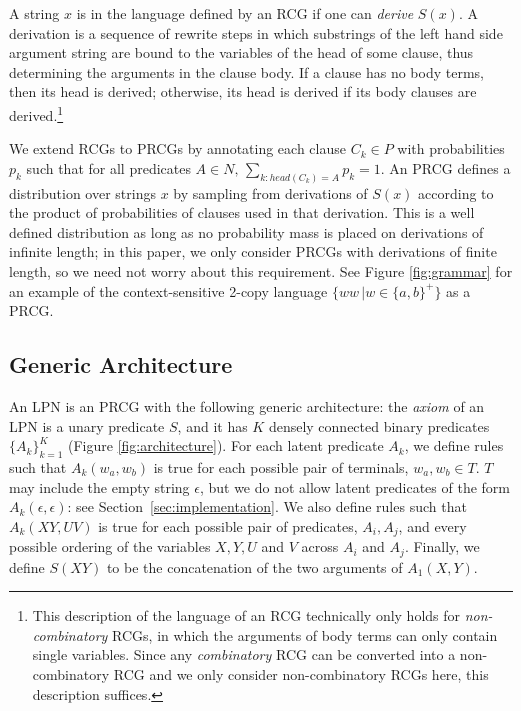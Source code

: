 \documentclass[10pt, twocolumn]{article}
\begin{document}
A string $x$ is in the language defined by an RCG if one can
\emph{derive} $S(x)$. A derivation is a sequence of rewrite steps in
which substrings of the left hand side argument string are bound to
the variables of the head of some clause, thus determining the
arguments in the clause body. If a clause has no body terms, then its
head is derived; otherwise, its head is derived if its body clauses
are derived.\footnote{This description of the language of an RCG
  technically only holds for \emph{non-combinatory} RCGs, in which the
  arguments of body terms can only contain single variables. Since any
  \emph{combinatory} RCG can be converted into a non-combinatory RCG
  and we only consider non-combinatory RCGs here, this description
  suffices.}

We extend RCGs to PRCGs by annotating each clause $C_k \in P$ with
probabilities $p_k$ such that for all predicates ${A \in N, \,
  \sum_{k:head(C_k)=A} p_k = 1}$. An PRCG defines a distribution over
strings $x$ by sampling from derivations of $S(x)$ according to the
product of probabilities of clauses used in that derivation. This is a
well defined distribution as long as no probability mass is placed on
derivations of infinite length; in this paper, we only consider PRCGs
with derivations of finite length, so we need not worry about this
requirement. See Figure \ref{fig:grammar} for an example of the context-sensitive 2-copy language $\{ww\,|w \in \{a,b\}^+\}$ as a PRCG.

\subsection{Generic Architecture}

An LPN is an PRCG with the following generic architecture: the
\emph{axiom} of an LPN is a unary predicate $S$, and it has $K$
densely connected binary predicates $\{A_k\}_{k=1}^K$ (Figure
\ref{fig:architecture}). For each latent predicate $A_k$, we define
rules such that $A_k(w_a,w_b)$ is true for each possible pair of
terminals, $w_a,w_b \in T$. $T$ may include the empty string $\epsilon$, but we
do not allow latent predicates of the form $A_k(\epsilon, \epsilon)$:
see Section~\ref{sec:implementation}. We also define rules such that
$A_k(XY,UV)$ is true for each possible pair of predicates, $A_i,A_j$,
and every possible ordering of the variables $X,Y,U$ and $V$ across
$A_i$ and $A_j$. Finally, we define $S(XY)$ to be the concatenation of
the two arguments of $A_1(X,Y)$.
 
\end{document}
